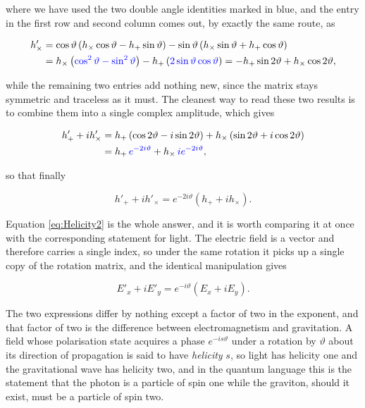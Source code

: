             where we have used the two double angle identities marked in blue, and the entry in the first row and second column comes out, by exactly the same route, as

            \begin{align*}
                h'_{\times} &= \cos\vartheta\left(h_{\times}\cos\vartheta - h_+\sin\vartheta\right) - \sin\vartheta\left(h_{\times}\sin\vartheta + h_+\cos\vartheta\right)\\
                &= h_{\times}\left({\color{blue}\cos^2\vartheta-\sin^2\vartheta}\right) - h_+\left({\color{blue}2\sin\vartheta\cos\vartheta}\right) = -h_+\sin2\vartheta + h_{\times}\cos2\vartheta,
            \end{align*}

            while the remaining two entries add nothing new, since the matrix stays symmetric and traceless as it must. The cleanest way to read these two results is to combine them into a single complex amplitude, which gives

            \begin{align*}
                h'_+ + ih'_{\times} &= h_+\left(\cos2\vartheta - i\sin2\vartheta\right) + h_{\times}\left(\sin2\vartheta + i\cos2\vartheta\right)\\
                &= h_+\,{\color{blue}e^{-2i\vartheta}} + h_{\times}\,{\color{blue}ie^{-2i\vartheta}},
            \end{align*}

            so that finally

            \begin{equation}\label{eq:Helicity2}
                h'_+ + ih'_{\times} = e^{-2i\vartheta}\left(h_+ + ih_{\times}\right).
            \end{equation}

            Equation \ref{eq:Helicity2} is the whole answer, and it is worth comparing it at once with the corresponding statement for light. The electric field is a vector and therefore carries a single index, so under the same rotation it picks up a single copy of the rotation matrix, and the identical manipulation gives

            \begin{equation}\label{eq:Helicity1}
                E'_x + iE'_y = e^{-i\vartheta}\left(E_x + iE_y\right).
            \end{equation}

            The two expressions differ by nothing except a factor of two in the exponent, and that factor of two is the difference between electromagnetism and gravitation. A field whose polarisation state acquires a phase $e^{-is\vartheta}$ under a rotation by $\vartheta$ about its direction of propagation is said to have \textit{helicity} $s$, so light has helicity one and the gravitational wave has helicity two, and in the quantum language this is the statement that the photon is a particle of spin one while the graviton, should it exist, must be a particle of spin two.

